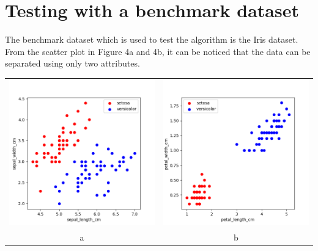 \documentclass{article}
\begin{document}
\section{Testing with a benchmark dataset}
The benchmark dataset which is used to test the algorithm is the Iris dataset. From the scatter plot in Figure 4a and 4b, it can be noticed that the data can be separated using only two attributes. 
\begin{center}
\begin{tabular}{cc}
\includegraphics[scale=0.3]{sepal_compare} &
\includegraphics[scale=0.3]{petal_compare} \\
\scriptsize a & \scriptsize b\\
\end{tabular}
\end{center}
\end{document}
